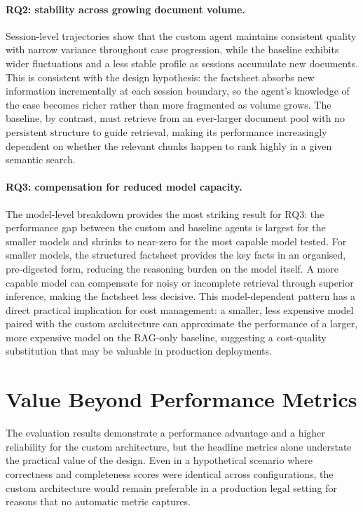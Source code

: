 \paragraph{RQ2: stability across growing document volume.}
Session-level trajectories show that the custom agent maintains consistent quality
with narrow variance throughout case progression, while the baseline exhibits wider
fluctuations and a less stable profile as sessions accumulate new documents. This is
consistent with the design hypothesis: the factsheet absorbs new information
incrementally at each session boundary, so the agent's knowledge of the case becomes
richer rather than more fragmented as volume grows. The baseline, by contrast, must
retrieve from an ever-larger document pool with no persistent structure to guide
retrieval, making its performance increasingly dependent on whether the relevant
chunks happen to rank highly in a given semantic search.

\paragraph{RQ3: compensation for reduced model capacity.}
The model-level breakdown provides the most striking result for RQ3: the performance
gap between the custom and baseline agents is largest for the smaller models and
shrinks to near-zero for the most capable model tested. For smaller models, the
structured factsheet provides the key facts in an organised, pre-digested form,
reducing the reasoning burden on the model itself. A more capable model can compensate
for noisy or incomplete retrieval through superior inference, making the factsheet
less decisive. This model-dependent pattern has a direct practical implication for
cost management: a smaller, less expensive model paired with the custom architecture
can approximate the performance of a larger, more expensive model on the RAG-only
baseline, suggesting a cost-quality substitution that may be valuable in
production deployments.

\section{Value Beyond Performance Metrics}

The evaluation results demonstrate a performance advantage and a higher reliability for the custom architecture, 
but the headline metrics alone understate the practical value of
the design. Even in a hypothetical scenario where correctness and completeness scores
were identical across configurations, the custom architecture would remain preferable in
a production legal setting for reasons that no automatic metric captures.

